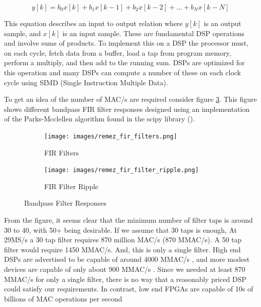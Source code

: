 \documentclass[a4paper, 12pt, notitlepage]{article}
\begin{document}
\begin{equation}
  y[k] = b_0x[k] + b_1x[k - 1] + b_2x[k - 2] + ... + b_Nx[k - N]
\end{equation}

This equation describes an input to output relation where $y[k]$ is an output sample, and $x[k]$ is an input sample.  These are fundamental DSP operations and involve sums of products.  To implement this on a DSP the processor must, on each cycle, fetch data from a buffer, load a tap from program memory, perform a multiply, and then add to the running sum.  DSPs are optimized for this operation and many DSPs can compute a number of these on each clock cycle using SIMD (Single Instruction Multiple Data).

To get an idea of the number of MAC/s are required consider figure \ref{fig:remez_filters}.  This figure shows different bandpass FIR filter responses designed using an implementation of the Parks-Mcclellen algorithm found in the scipy library (\cite{scipy-remez}).

\begin{figure}[ht]
\centering
\begin{subfigure}[b]{0.45\textwidth}
  \texttt{[image: images/remez\_fir\_filters.png]}
  \caption{FIR Filters}
  \label{fig:fir_filters_response}
\end{subfigure}
\begin{subfigure}[b]{0.45\textwidth}
  \texttt{[image: images/remez\_fir\_filter\_ripple.png]}
  \caption{FIR Filter Ripple}
  \label{fig:fir_filters_ripple}
\end{subfigure}

\caption{Bandpass Filter Responses}
\label{fig:remez_filters}
\end{figure}

From the figure, it seems clear that the minimum number of filter taps is around 30 to 40, with 50+ being desirable.  If we assume that 30 taps is enough,  At 29MS/s a 30 tap filter requires 870 million MAC/s (870 MMAC/s).  A 50 tap filter would require 1450 MMAC/s.  And, this is only a single filter.  High end DSPs are advertised to be capable of around 4000 MMAC/s \cite{tigersharc_mac_performance}, and more modest devices are capable of only about 900 MMAC/s \cite{sharc_mac_performance}.  Since we needed at least 870 MMAC/s for only a single filter, there is no way that a reasonably priced DSP could satisfy our requirements.  In contrast, low end FPGAs are capable of 10s of billions of MAC operations per second \cite{xilinx_mac_performance}
\end{document}
